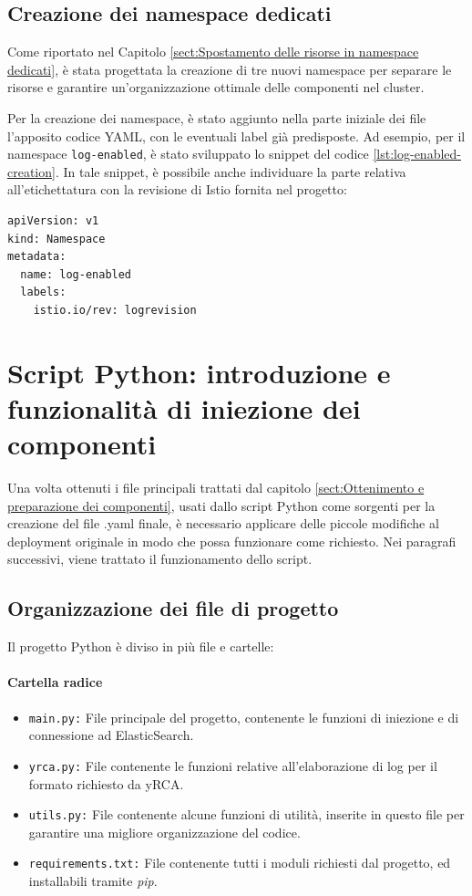 \subsection{Creazione dei namespace dedicati}
Come riportato nel Capitolo \ref{sect:Spostamento delle risorse in namespace dedicati}, è stata progettata la creazione di tre nuovi namespace per separare le risorse e garantire un'organizzazione ottimale delle componenti nel cluster.

Per la creazione dei namespace, è stato aggiunto nella parte iniziale dei file l'apposito codice YAML, con le eventuali label già predisposte. Ad esempio, per il namespace \verb|log-enabled|, è stato sviluppato lo snippet del codice \ref{lst:log-enabled-creation}. In tale snippet, è possibile anche individuare la parte relativa all'etichettatura con la revisione di Istio fornita nel progetto:
\begin{lstlisting}[caption={Snippet della creazione del namespace log-enabled},label=lst:log-enabled-creation, escapechar=|]
apiVersion: v1
kind: Namespace
metadata:
  name: log-enabled
  labels:
    istio.io/rev: logrevision
\end{lstlisting}


\section{Script Python: introduzione e funzionalità di iniezione dei componenti}

Una volta ottenuti i file principali trattati dal capitolo \ref{sect:Ottenimento e preparazione dei componenti}, usati dallo script Python come sorgenti per la creazione del file .yaml finale, è necessario applicare delle piccole modifiche al deployment originale in modo che possa funzionare come richiesto. Nei paragrafi successivi, viene trattato il funzionamento dello script.

\subsection{Organizzazione dei file di progetto}
Il progetto Python è diviso in più file e cartelle:
\paragraph{Cartella radice}
\begin{itemize}
    \item \texttt{main.py:} File principale del progetto, contenente le funzioni di iniezione e di connessione ad ElasticSearch.
    \item \texttt{yrca.py:} File contenente le funzioni relative all'elaborazione di log per il formato richiesto da yRCA.
    \item \texttt{utils.py:} File contenente alcune funzioni di utilità, inserite in questo file per garantire una migliore organizzazione del codice.
    \item \texttt{requirements.txt:} File contenente tutti i moduli richiesti dal progetto, ed installabili tramite \textit{pip}.
\end{itemize}
